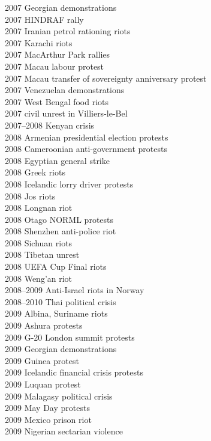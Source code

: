 2007 Georgian demonstrations\\
2007 HINDRAF rally\\
2007 Iranian petrol rationing riots\\
2007 Karachi riots\\
2007 MacArthur Park rallies\\
2007 Macau labour protest\\
2007 Macau transfer of sovereignty anniversary protest\\
2007 Venezuelan demonstrations\\
2007 West Bengal food riots\\
2007 civil unrest in Villiers-le-Bel\\
2007–2008 Kenyan crisis\\
2008 Armenian presidential election protests\\
2008 Cameroonian anti-government protests\\
2008 Egyptian general strike\\
2008 Greek riots\\
2008 Icelandic lorry driver protests\\
2008 Jos riots\\
2008 Longnan riot\\
2008 Otago NORML protests\\
2008 Shenzhen anti-police riot\\
2008 Sichuan riots\\
2008 Tibetan unrest\\
2008 UEFA Cup Final riots\\
2008 Weng'an riot\\
2008–2009 Anti-Israel riots in Norway\\
2008–2010 Thai political crisis\\
2009 Albina, Suriname riots\\
2009 Ashura protests\\
2009 G-20 London summit protests\\
2009 Georgian demonstrations\\
2009 Guinea protest\\
2009 Icelandic financial crisis protests\\
2009 Luquan protest\\
2009 Malagasy political crisis\\
2009 May Day protests\\
2009 Mexico prison riot\\
2009 Nigerian sectarian violence\\
